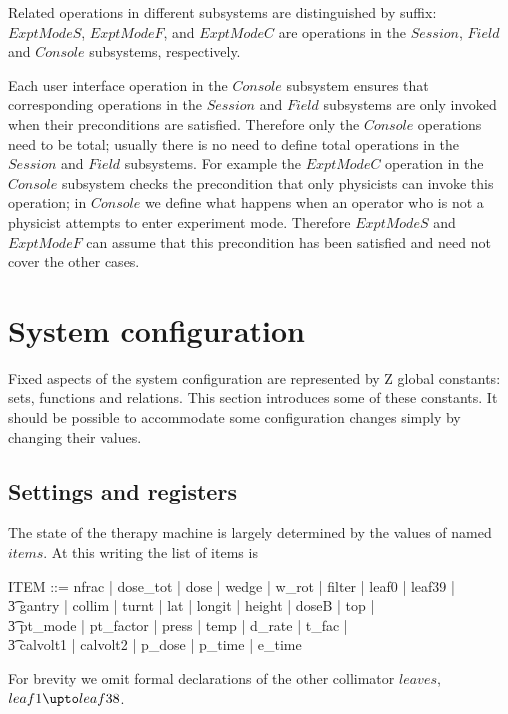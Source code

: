 Related operations in different subsystems are distinguished by
suffix: $ExptModeS$, $ExptModeF$, and $ExptModeC$ are operations in
the $Session$, $Field$ and $Console$ subsystems, respectively.  

Each user interface operation in the $Console$ subsystem ensures that
corresponding operations in the $Session$ and $Field$ subsystems are only
invoked when their preconditions are satisfied.  Therefore only the
$Console$ operations need to be total; usually there is no need to
define total operations in the $Session$ and $Field$ subsystems.  For
example the $ExptModeC$ operation in the $Console$ subsystem checks the
precondition that only physicists can invoke this operation; in
$Console$ we define what happens when an operator who is not a
physicist attempts to enter experiment mode.  Therefore $ExptModeS$
and $ExptModeF$ can assume that this precondition has been satisfied
and need not cover the other cases.

\section{System configuration} \label{sect:config}

Fixed aspects of the system configuration are represented by Z global
constants: sets, functions and relations.  This section introduces
some of these constants.  It should be possible to accommodate some
configuration changes simply by changing their values.

\subsection{Settings and registers} \label{sect:settings}

The state of the therapy machine is largely determined by the values
of named $items$.  At this writing the list of items is

\begin{zed} 
ITEM ::= nfrac | dose\_tot | dose | wedge | w\_rot | filter | leaf0 | leaf39 | \\
\t3	gantry | collim | turnt | lat | longit | height | doseB | top | \\
\t3	pt\_mode | pt\_factor | press | temp | d\_rate | t\_fac | \\
\t3	calvolt1 | calvolt2 | p\_dose | p\_time | e\_time
\end{zed}
For brevity we omit formal declarations of the other collimator $leaves$,
$leaf1 \upto leaf38$.

